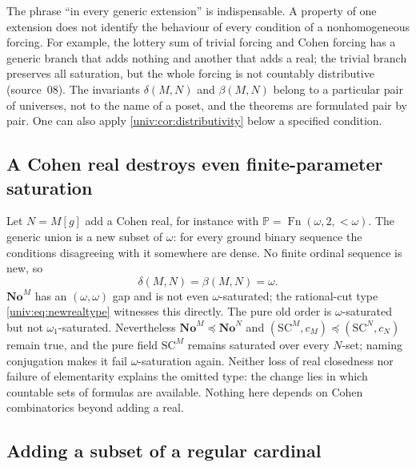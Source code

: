 \documentclass[11pt,letterpaper]{article}
\numberwithin{equation}{section}
\theoremstyle{definition}
\theoremstyle{remark}
\newcommand{\No}{\mathbf{No}}
\newcommand{\SC}{\mathrm{SC}}
\newcommand{\NoM}{\No^{M}}
\newcommand{\NoN}{\No^{N}}
\newcommand{\SCM}{\SC^{M}}
\newcommand{\SCN}{\SC^{N}}
\begin{document}
The phrase ``in every generic extension'' is indispensable. A property of one
extension does not identify the behaviour of every condition of a
nonhomogeneous forcing. For example, the lottery sum of trivial forcing and
Cohen forcing has a generic branch that adds nothing and another that adds a
real; the trivial branch preserves all saturation, but the whole forcing is
not countably distributive (source~08). The invariants $\delta(M,N)$ and
$\beta(M,N)$ belong to a particular pair of universes, not to the name of a
poset, and the theorems are formulated pair by pair. One can also apply
\cref{univ:cor:distributivity} below a specified condition.

\subsection{A Cohen real destroys even finite-parameter saturation}

Let $N=M[g]$ add a Cohen real, for instance with
$\mathbb P=\operatorname{Fn}(\omega,2,{<}\omega)$. The generic union is a new
subset of $\omega$: for every ground binary sequence the conditions disagreeing
with it somewhere are dense. No finite ordinal sequence is new, so
\[
 \delta(M,N)=\beta(M,N)=\omega.
\]
$\NoM$ has an $(\omega,\omega)$ gap and is not even $\omega$-saturated; the
rational-cut type \eqref{univ:eq:newrealtype} witnesses this directly. The pure
old order is $\omega$-saturated but not $\omega_1$-saturated. Nevertheless
$\NoM\preccurlyeq\NoN$ and $(\SCM,c_M)\preccurlyeq(\SCN,c_N)$ remain true, and
the pure field $\SCM$ remains saturated over every $N$-set; naming conjugation
makes it fail $\omega$-saturation again. Neither loss of real closedness nor
failure of elementarity explains the omitted type: the change lies in which
countable sets of formulas are available. Nothing here depends on Cohen
combinatorics beyond adding a real.

\subsection{Adding a subset of a regular cardinal}
\end{document}
